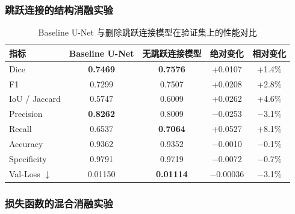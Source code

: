 \subsubsection{跳跃连接的结构消融实验}

\begin{table}[htbp]
    \centering
    \caption{Baseline U-Net 与删除跳跃连接模型在验证集上的性能对比}
    \label{tab:ablation_skip_connection}
    \begin{tabular}{lcccc}
        \toprule
        指标 & Baseline U-Net & 无跳跃连接模型 & 绝对变化 & 相对变化 \\
        \midrule
        Dice         & \textbf{0.7469} & \textbf{0.7576} & +0.0107 & +1.4\% \\
        F1           & 0.7299 & 0.7507 & +0.0208 & +2.8\% \\
        IoU / Jaccard & 0.5747 & 0.6009 & +0.0262 & +4.6\% \\
        Precision    & \textbf{0.8262} & 0.8009 & $-$0.0253 & $-$3.1\% \\
        Recall       & 0.6537 & \textbf{0.7064} & +0.0527 & +8.1\% \\
        Accuracy     & 0.9362 & 0.9352 & $-$0.0010 & $-$0.1\% \\
        Specificity  & 0.9791 & 0.9719 & $-$0.0072 & $-$0.7\% \\
        Val-Loss $\downarrow$ & 0.01150 & \textbf{0.01114} & $-$0.00036 & $-$3.1\% \\
        \bottomrule
    \end{tabular}
\end{table}

\subsubsection{损失函数的混合消融实验}


